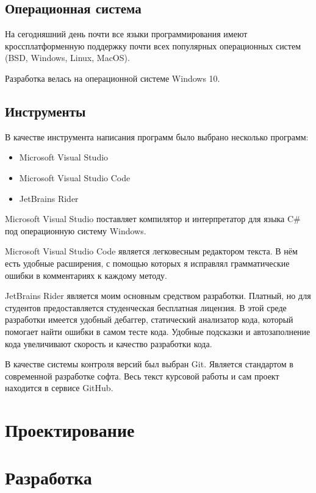 \subsection{Операционная система}

На сегодняшний день почти все языки программирования имеют кроссплатформенную поддержку почти всех популярных операционных систем (BSD, Windows, Linux, MacOS).

Разработка велась на операционной системе Windows 10.

\subsection{Инструменты}

В качестве инструмента написания программ было выбрано несколько программ:

\begin{itemize}
	\item Microsoft Visual Studio
	\item Microsoft Visual Studio Code
	\item JetBrains Rider
\end{itemize}

Microsoft Visual Studio поставляет компилятор и интерпретатор для языка C\# под операционную систему Windows.

Microsoft Visual Studio Code является легковесным редактором текста. В нём есть удобные расширения, с помощью которых я исправлял грамматические ошибки в комментариях к каждому методу.

JetBrains Rider является моим основным средством разработки. Платный, но для студентов предоставляется студенческая бесплатная лицензия. В этой среде разработки имеется удобный дебаггер, статический анализатор кода, который помогает найти ошибки в самом тесте кода. Удобные подсказки и автозаполнение кода увеличивают скорость и качество разработки кода.

В качестве системы контроля версий был выбран Git. Является стандартом в современной разработке софта. Весь текст курсовой работы и сам проект находится в сервисе GitHub\cite{GitHub}.

\newpage
\section{Проектирование}

\newpage
\section{Разработка}

